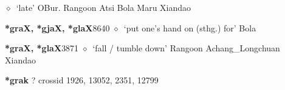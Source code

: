\begin{list}{}{\leftmargin=1.5em \itemindent=-1.5em}
\hspace{1ex}
         $\diamond$~`late'
         OBur. 
\hspace{1ex}
         Rangoon 
\hspace{1ex}
         Atsi 
\hspace{1ex}
         Bola 
\hspace{1ex}
         Maru 
\hspace{1ex}
         Xiandao 
  \item {\footnotesize \textbf{*graX, *gjaX, *glaX}}{\tiny 8640}
\hspace{1ex}
         $\diamond$~`put one's hand on (sthg.) for'
         Bola 
  \item {\footnotesize \textbf{*graX, *glaX}}{\tiny 3871}
\hspace{1ex}
         $\diamond$~`fall / tumble down'
         Rangoon 
\hspace{1ex}
         Achang\_Longchuan 
\hspace{1ex}
         Xiandao 
  \end{list}
\item
\textbf{*grak}
?
  {\tiny crossid 1926, 13052, 2351, 12799}
